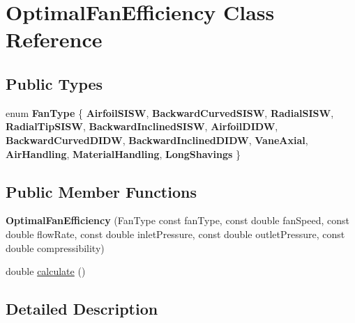 \hypertarget{class_optimal_fan_efficiency}{}\section{Optimal\+Fan\+Efficiency Class Reference}
\label{class_optimal_fan_efficiency}
\subsection*{Public Types}
\begin{DoxyCompactItemize}
\item 
\mbox{\label{class_optimal_fan_efficiency_a468d7943ddcfc8678373762cd0641823}} 
enum {\bfseries Fan\+Type} \{ \newline
{\bfseries Airfoil\+S\+I\+SW}, 
{\bfseries Backward\+Curved\+S\+I\+SW}, 
{\bfseries Radial\+S\+I\+SW}, 
{\bfseries Radial\+Tip\+S\+I\+SW}, 
\newline
{\bfseries Backward\+Inclined\+S\+I\+SW}, 
{\bfseries Airfoil\+D\+I\+DW}, 
{\bfseries Backward\+Curved\+D\+I\+DW}, 
{\bfseries Backward\+Inclined\+D\+I\+DW}, 
\newline
{\bfseries Vane\+Axial}, 
{\bfseries Air\+Handling}, 
{\bfseries Material\+Handling}, 
{\bfseries Long\+Shavings}
 \}
\end{DoxyCompactItemize}
\subsection*{Public Member Functions}
\begin{DoxyCompactItemize}
\item 
\mbox{\label{class_optimal_fan_efficiency_aff5850e4b0f6831e6d14436c138a723d}} 
{\bfseries Optimal\+Fan\+Efficiency} (Fan\+Type const fan\+Type, const double fan\+Speed, const double flow\+Rate, const double inlet\+Pressure, const double outlet\+Pressure, const double compressibility)
\item 
double \hyperlink{class_optimal_fan_efficiency_ac35291d1095c74373393ac510e45ae02}{calculate} ()
\end{DoxyCompactItemize}


\subsection{Detailed Description}


